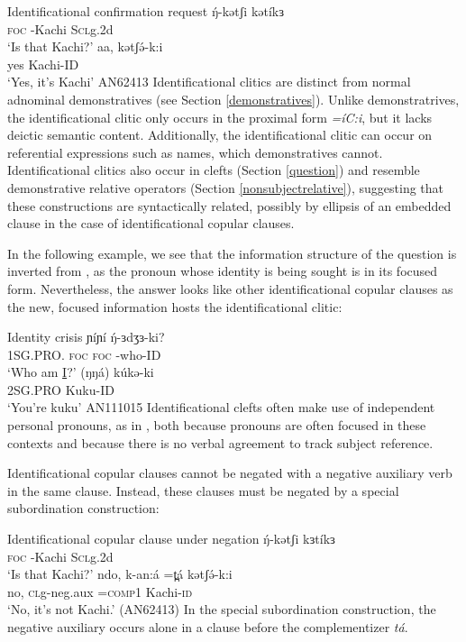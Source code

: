 \ea  Identificational confirmation request \label{ex:copular:id2}
	 	\gll  ŋ́-kətʃi kətíkɜ\\
					 \textsc{foc} -Kachi	   S\textsc{cl}g.2d	\\
				\glt   ‘Is that Kachi?’ 
		\gll aa, 	kətʃə́-k:i	\\
					 yes	Kachi-ID	\\
				\glt ‘Yes, it’s Kachi’	\hfill	 AN62413
\z  
Identificational clitics are distinct from normal adnominal demonstratives (see Section \ref{demonstratives}). Unlike demonstratrives, the identificational clitic only occurs in the proximal form \textit{=íC:i}, but it lacks deictic semantic content. Additionally, the identificational clitic can occur on referential expressions such as names, which demonstratives cannot. Identificational clitics also occur in clefts (Section \ref{question}) and resemble demonstrative relative operators (Section \ref{nonsubjectrelative}), suggesting that these constructions are syntactically related, possibly by ellipsis of an embedded clause in the case of identificational copular clauses. 

In the following example, we see that the information structure of the question is inverted from , as the pronoun whose identity is being sought is in its focused form. Nevertheless, the answer looks like other identificational copular clauses as the new, focused information hosts the identificational clitic:

\ea  Identity crisis\label{ex:copular:id3}
	 	\gll 	ɲíɲí ŋ́-ɜdʒɜ-ki? \\
						1SG.PRO. \textsc{foc} 	   \textsc{foc} -who-ID \\
				\glt  	‘Who am \underline{I}?’ 
		\gll 	(ŋŋá) kúkə-ki	\\
						2SG.PRO	Kuku-ID\\
				\glt 	‘You're kuku’ \hfill AN111015 \label{ex:copular:id3b}
\z 
Identificational clefts often make use of independent personal pronouns, as in , both because pronouns are often focused in these contexts and because there is no verbal agreement to track subject reference.

Identificational copular clauses cannot be negated with a negative auxiliary verb in the same clause. Instead, these clauses must be negated by a special subordination construction:

\ea  Identificational copular clause under negation
	 	\gll 	 	ŋ́-kətʃi kɜtíkɜ		\\
					 \textsc{foc} -Kachi	   S\textsc{cl}g.2d	\\
				\glt  		‘Is that Kachi?’ 
			\gll 		ndo, 		k-an:á  	=t̪á		kətʃə́-k:i\\
			no,		\textsc{cl}g-neg.aux	 =\textsc{comp1}	Kachi-\textsc{id}\\
				\glt 	‘No, it’s not Kachi.’		\hfill	 (AN62413)
\z  
In the special subordination construction, the negative auxiliary occurs alone in a clause before the complementizer \textit{tá}.

